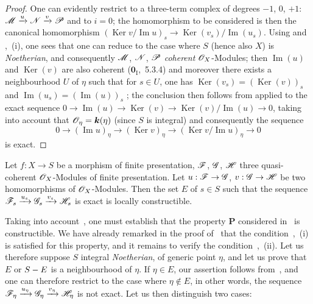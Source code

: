 
\begin{proof}
One can evidently restrict to a three-term complex of degrees $-1$, $0$, $+1$:
$\mathscr{M}\xrightarrow{u}\mathscr{N}\xrightarrow{v}\mathscr{P}$ and to $i=0$; the homomorphism to be considered is then the canonical homomorphism
$(\operatorname{Ker}v/\operatorname{Im}u)_s\to\operatorname{Ker}(v_s)/\operatorname{Im}(u_s)$.
Using  and ,~(i), one sees that one can reduce to the case where $S$ (hence also $X$)
is \emph{Noetherian}, and consequently $\mathscr{M}$, $\mathscr{N}$, $\mathscr{P}$ \emph{coherent} $\mathscr{O}_X$-Modules; then
$\operatorname{Im}(u)$ and $\operatorname{Ker}(v)$ are also coherent ($\mathbf{0}_{\mathrm{I}}$,~5.3.4) and moreover there exists a neighbourhood $U$ of
$\eta$ such that for $s\in U$, one has $\operatorname{Ker}(v_s)=(\operatorname{Ker}(v))_s$ and
$\operatorname{Im}(u_s)=(\operatorname{Im}(u))_s$ ; the conclusion
then follows from  applied to the exact sequence
$0\to\operatorname{Im}(u)\to\operatorname{Ker}(v)\to\operatorname{Ker}(v)/\operatorname{Im}(u)\to0$,
taking into account that $\mathscr{O}_\eta=\boldsymbol{k}(\eta)$ (since $S$ is integral) and consequently the sequence
\[
 0\longrightarrow(\operatorname{Im}u)_\eta\longrightarrow(\operatorname{Ker}v)_\eta
 \longrightarrow(\operatorname{Ker}v/\operatorname{Im}u)_\eta\longrightarrow0
\]
is exact.
\end{proof}

\begin{proposition}[9.4.4]
\label{IV.9.4.4}
Let $f:X\to S$ be a morphism of finite presentation, $\mathscr{F}$, $\mathscr{G}$, $\mathscr{H}$ three quasi-coherent $\mathscr{O}_X$-Modules of finite presentation.
Let $u:\mathscr{F}\to\mathscr{G}$, $v:\mathscr{G}\to\mathscr{H}$ be two homomorphisms of $\mathscr{O}_X$-Modules.
Then the set $E$ of $s\in S$ such that the sequence $\mathscr{F}_s\xrightarrow{u_s}\mathscr{G}_s\xrightarrow{v_s}\mathscr{H}_s$ is exact is locally constructible.
\end{proposition}

Taking into account~, one must establish that the property $\boldsymbol{P}$ considered in~ is constructible.
We have already remarked in the proof of~ that the condition~,~(i) is satisfied for this property, and it remains to verify the condition~,~(ii).
Let us therefore suppose $S$ integral \emph{Noetherian}, of generic point $\eta$, and let us prove that $E$ or $S- E$ is a neighbourhood of $\eta$.
If $\eta\in E$, our assertion follows from~, and one can therefore restrict to the case where $\eta\notin E$, in other words, the sequence $\mathscr{F}_\eta\xrightarrow{u_\eta}\mathscr{G}_\eta\xrightarrow{v_\eta}\mathscr{H}_\eta$ is not exact.
Let us then distinguish two cases:

